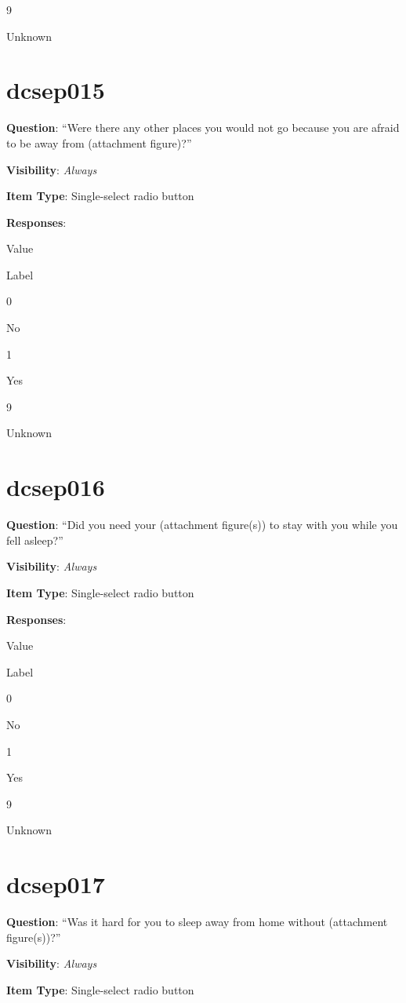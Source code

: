 \documentclass[]{book}
\begin{document}
9

Unknown

\hypertarget{dcsep015}{%
\section{dcsep015}\label{dcsep015}}

\textbf{Question}: ``Were there any other places you would not go because you are afraid to be away from (attachment figure)?''

\textbf{Visibility}: \emph{Always}

\textbf{Item Type}: Single-select radio button

\textbf{Responses}:

Value

Label

0

No

1

Yes

9

Unknown

\hypertarget{dcsep016}{%
\section{dcsep016}\label{dcsep016}}

\textbf{Question}: ``Did you need your (attachment figure(s)) to stay with you while you fell asleep?''

\textbf{Visibility}: \emph{Always}

\textbf{Item Type}: Single-select radio button

\textbf{Responses}:

Value

Label

0

No

1

Yes

9

Unknown

\hypertarget{dcsep017}{%
\section{dcsep017}\label{dcsep017}}

\textbf{Question}: ``Was it hard for you to sleep away from home without (attachment figure(s))?''

\textbf{Visibility}: \emph{Always}

\textbf{Item Type}: Single-select radio button
\end{document}
